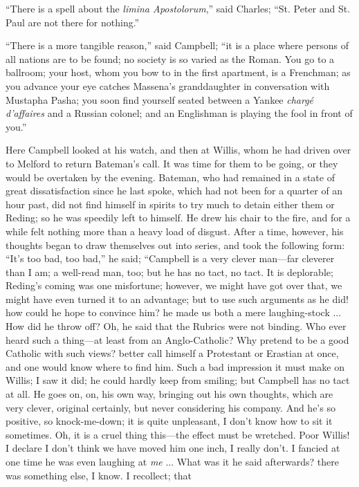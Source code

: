 ``There is a spell about the \emph{limina Apostolorum},''
said Charles; ``St. Peter and St. Paul are not there for
nothing.''

``There is a more tangible reason,'' said Campbell;
``it is a place where persons of all nations are to be found; no
society is so varied as the Roman. You go to a ballroom; your host,
whom you bow to in the first apartment, is a Frenchman; as you advance
your eye catches Massena's granddaughter in conversation with Mustapha
Pasha; you soon find yourself seated between a Yankee \emph{chargé d'affaires}
and a Russian colonel; and an Englishman is playing the fool in front
of you.''

Here Campbell looked at his watch, and then at Willis, whom he had
driven over to Melford to return Bateman's call. It was time for them
to be going, or they would be overtaken by the evening. Bateman, who
had remained in a state of great dissatisfaction since he last spoke,
which had not been for a quarter of an hour past, did not find
himself in spirits to try much to detain either them or Reding; so he
was speedily left to himself. He drew his chair to the fire, and for a
while felt nothing more than a heavy load of disgust. After a time,
however, his thoughts began to draw themselves out into series, and
took the following form: ``It's too bad, too bad,'' he said;
``Campbell is a very clever man—far cleverer than I am; a
well-read man, too; but he has no tact, no tact. It is deplorable;
Reding's coming was one misfortune; however, we might have got over
that, we might have even turned it to an advantage; but to use such
arguments as he did! how could he hope to convince him? he made us
both a mere laughing-stock ... How did he throw off? Oh, he said that
the Rubrics were not binding. Who ever heard such a thing—at least
from an Anglo-Catholic? Why pretend to be a good Catholic with such
views? better call himself a Protestant or Erastian at once, and one
would know where to find him. Such a bad impression it must make on
Willis; I saw it did; he could hardly keep from smiling; but Campbell
has no tact at all. He goes on, on, his own way, bringing out his own
thoughts, which are very clever, original certainly, but never
considering his company. And he's so positive, so knock-me-down; it is
quite unpleasant, I don't know how to sit it sometimes. Oh, it is a
cruel thing this—the effect must be wretched. Poor Willis! I declare
I don't think we have moved him one inch, I really don't. I fancied at
one time he was even laughing at \emph{me} ... What was it he said
afterwards? there was something else, I know. I recollect; that
